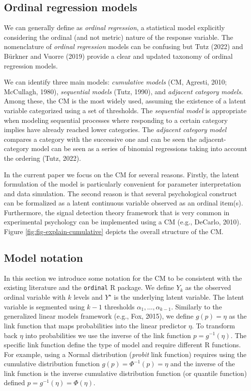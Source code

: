 \documentclass[
  man,floatsintext]{apa6}
\begin{document}
\normalsize

\subsection{Ordinal regression models}\label{ordinal-regression-models}

We can generally define as \emph{ordinal regression}, a statistical model explicitly considering the ordinal (and not metric) nature of the response variable. The nomenclature of \emph{ordinal regression} models can be confusing but Tutz (2022) and Bürkner and Vuorre (2019) provide a clear and updated taxonomy of ordinal regression models.

We can identify three main models: \emph{cumulative models} (CM, Agresti, 2010; McCullagh, 1980), \emph{sequential models} (Tutz, 1990), and \emph{adjacent category models}. Among these, the CM is the most widely used, assuming the existence of a latent variable categorized using a set of thresholds. The \emph{sequential model} is appropriate when modeling sequential processes where responding to a certain category implies have already reached lower categories. The \emph{adjacent category model} compares a category with the successive one and can be seen the adjacent-category model can be seen as a series of binomial regressions taking into account the ordering (Tutz, 2022).

In the current paper we focus on the CM for several reasons. Firstly, the latent formulation of the model is particularly convenient for parameter interpretation and data simulation. The second reason is that several psychological construct can be formalized as a latent continuous variable observed as an ordinal item(s). Furthermore, the signal detection theory framework that is very common in experimental psychology can be implemented using a CM (e.g., DeCarlo, 2010). Figure \ref{fig:fig-explain-cumulative} depicts the overall structure of the CM.

\subsection{Model notation}\label{model-notation}

In this section we introduce some notation for the CM to be consistent with the existing literature and the \texttt{ordinal} R package. We define \(Y_k\) as the observed ordinal variable with \(k\) levels and \(Y^\star\) is the underlying latent variable. The latent variable is segmented using \(k - 1\) thresholds \(\alpha_1, \dots, \alpha_{k - 1}\). Similarly to the generalized linear models framework (e.g., Fox, 2015), we define \(g(p) = \eta\) as the link function that maps probabilities into the linear predictor \(\eta\). To transform back \(\eta\) into probabilities we use the inverse of the link function \(p = g^{-1}(\eta)\). The specific link function define the type of model and require different R functions. For example, using a Normal distribution (\emph{probit} link function) requires using the cumulative distribution function \(g(p) = \Phi^{-1}(p) = \eta\) and the inverse of the link function is the inverse cumulative distribution function (or quantile function) defined \(p = g^{-1}(\eta) = \Phi(\eta)\).
\end{document}
